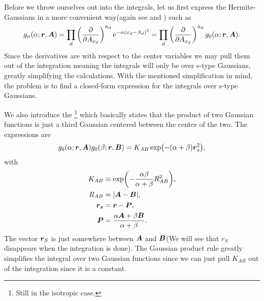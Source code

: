     Before we throw ourselves out into the integrals, let us first express the
    Hermite-Gaussians in a more convenient way(again see
    \cite{HelgakerTaylorGauss} and \cite{HelgakerGauss}) such as
        \begin{equation}
            g_n(\alpha;\boldsymbol{{r}},\boldsymbol{{A}}) = \prod_d  \left(\frac{\mathrm{\partial}}{\mathrm{\partial} A_{x_d}}\right)^{n_d}
            \mathrm{e}^{-\alpha (x_d-A_d)^2} = \prod_d \left(\frac{\mathrm{\partial}}{\mathrm{\partial} A_{x_d}}\right)^{n_d}
            g_0(\alpha;\boldsymbol{{r}},\boldsymbol{{A}}).
            \label{eq:centerDerGauss}
        \end{equation}
    Since the derivatives are with respect to the center variables we may pull
    them out of the integration meaning the integrals will only be over s-type
    Gaussians, greatly simplifying the calculations. With the mentioned
    simplification in mind, the problem is to find a closed-form expression for
    the integrals over s-type Gaussians.

    We also introduce the \footnote{Still in the
    isotropic case.} which basically states that the product of two Gaussian
    functions is just a third Gaussian centered between the center of the two.
    The expressions are
        \begin{equation}
            g_0(\alpha;\boldsymbol{{r}},\boldsymbol{{A}})g_0(\beta;\boldsymbol{{r}},\boldsymbol{{B}}) =
            K_{AB}\exp(-(\alpha+\beta)\boldsymbol{{r}}^2_s),
            \label{eq:gaussianProductRule}
        \end{equation}
    with
        \begin{equation}
            \begin{aligned}
                K_{AB} &\equiv \exp(-\frac{\alpha\beta}{\alpha+\beta}R^2_{AB}),
                \\
                R_{AB} &= \abs{\boldsymbol{{A}} - \boldsymbol{{B}}}, \\
                \boldsymbol{{r_s}} &= \boldsymbol{{r}} - \boldsymbol{{P}}, \\
                \boldsymbol{{P}} &= \frac{\alpha\boldsymbol{{A}} +
                \beta\boldsymbol{{B}}}{\alpha + \beta}.
            \end{aligned}
        \end{equation}
    The vector $\boldsymbol{{r}}_S$ is just somewhere between $\boldsymbol{{A}}$ and
    $\boldsymbol{{B}}$(We will see that $r_S$ disappears when the integration is done).
    The Gaussian product rule greatly simplifies the integral over two Gaussian
    functions since we can just pull $K_{AB}$ out of the integration since it
    is a constant.

